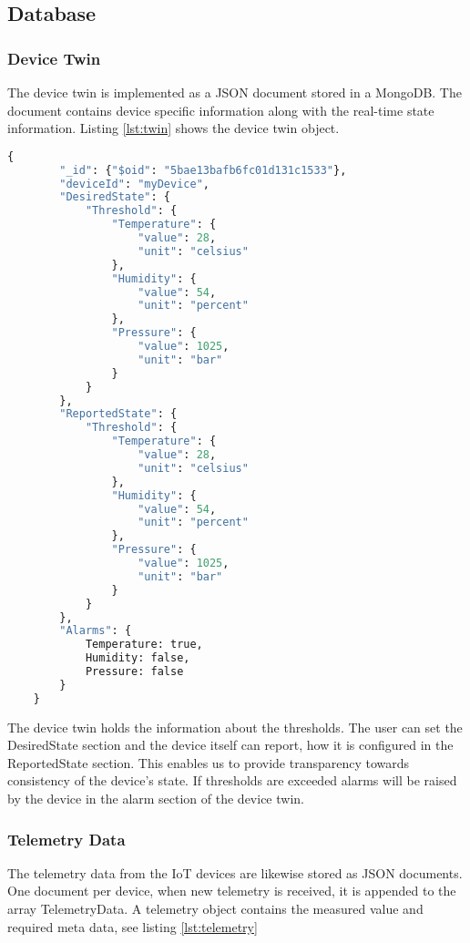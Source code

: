 \subsection{Database}
\subsubsection{Device Twin}
The device twin is implemented as a JSON document stored in a MongoDB. The document contains device specific information along with the real-time state information. Listing \ref{lst:twin} shows the device twin object.
\begin{lstlisting}[language=Python, caption=Device Twin, label={lst:twin}, basicstyle=\tiny]
    {
        "_id": {"$oid": "5bae13bafb6fc01d131c1533"}, 
        "deviceId": "myDevice", 
        "DesiredState": {
            "Threshold": {
                "Temperature": {
                    "value": 28, 
                    "unit": "celsius"
                }, 
                "Humidity": {
                    "value": 54, 
                    "unit": "percent"
                }, 
                "Pressure": {
                    "value": 1025, 
                    "unit": "bar"
                }
            }
        }, 
        "ReportedState": {
            "Threshold": {
                "Temperature": {
                    "value": 28, 
                    "unit": "celsius"
                }, 
                "Humidity": {
                    "value": 54, 
                    "unit": "percent"
                }, 
                "Pressure": {
                    "value": 1025, 
                    "unit": "bar"
                }
            }
        }, 
        "Alarms": {
            Temperature: true,
            Humidity: false,
            Pressure: false
        }
    } 
\end{lstlisting}

The device twin holds the information about the thresholds. The user can set the DesiredState section and the device itself can report, how it is configured in the ReportedState section. This enables us to provide transparency towards consistency of the device's state. If thresholds are exceeded alarms will be raised by the device in the alarm section of the device twin.

\subsubsection{Telemetry Data}

The telemetry data from the IoT devices are likewise stored as JSON documents. One document per device, when new telemetry is received, it is appended to the array TelemetryData. A telemetry object contains the measured value and required meta data, see listing \ref{lst:telemetry} 

